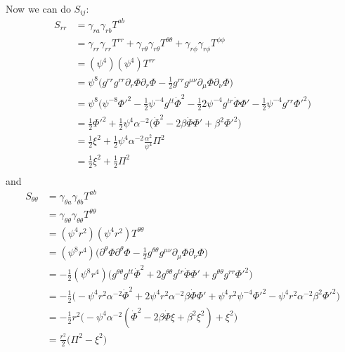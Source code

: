 \documentclass[12pt]{article}
\numberwithin{equation}{section}
\begin{document}
Now we can do $S_{ij}$:
\begin{equation} \label{eq:S_rr}
\begin{aligned}
S_{rr} &= \gamma_{ra} \gamma_{rb} T^{ab} \\
&= \gamma_{rr} \gamma_{rr} T^{rr} + \gamma_{r \theta} \gamma_{r\theta} T^{\theta \theta} + \gamma_{r\phi} \gamma_{r\phi} T^{\phi \phi} \\
&= (\psi^4) (\psi^4) T^{rr} \\
&= \psi^8 \Big( g^{rr} g^{rr} \partial_r \Phi \partial_r \Phi - \frac{1}{2} g^{r r} g^{\mu \nu} \partial_\mu \Phi \partial_\nu \Phi \Big) \\
&= \psi^8 \Big( \psi^{-8} \Phi'^2 - \frac{1}{2} \psi^{-4} g^{t t} \dot{\Phi}^2 - \frac{1}{2} 2 \psi^{-4} g^{t r} \dot{\Phi} \Phi' - \frac{1}{2} \psi^{-4} g^{r r} \Phi'^2 \Big) \\
&= \frac{1}{2} \Phi'^2 + \frac{1}{2} \psi^4 \alpha^{-2} \Big( \dot{\Phi}^2 - 2 \beta \dot{\Phi} \Phi' + \beta^2 \Phi'^2 \Big) \\
&= \frac{1}{2} \xi^2 + \frac{1}{2} \psi^4 \alpha^{-2} \frac{\alpha^2}{\psi^4} \Pi^2 \\
&= \frac{1}{2} \xi^2 + \frac{1}{2} \Pi^2 \\
\end{aligned}
\end{equation}
and
\begin{equation} \label{eq:S_thetatheta}
\begin{aligned}
S_{\theta \theta} &= \gamma_{\theta a} \gamma_{\theta b} T^{ab} \\
&= \gamma_{\theta \theta} \gamma_{\theta \theta} T^{\theta \theta} \\
&= (\psi^4 r^2) (\psi^4 r^2) T^{\theta \theta} \\
&= (\psi^8 r^4) \Big( \partial^\theta \Phi \partial^\theta \Phi - \frac{1}{2} g^{\theta \theta} g^{\mu \nu} \partial_\mu \Phi \partial_\nu \Phi  \Big) \\
&= - \frac{1}{2} (\psi^8 r^4) \Big( g^{\theta \theta} g^{t t} \dot{\Phi}^2 + 2 g^{\theta \theta} g^{t r} \dot{\Phi} \Phi' + g^{\theta \theta} g^{r r} \Phi'^2  \Big) \\
&= - \frac{1}{2} \Big( - \psi^4 r^2 \alpha^{-2} \dot{\Phi}^2 + 2 \psi^4 r^2 \alpha^{-2} \beta \dot{\Phi} \Phi' + \psi^4 r^2 \psi^{-4} \Phi'^2 - \psi^4 r^2 \alpha^{-2} \beta^2 \Phi'^2 \Big) \\
&= - \frac{1}{2} r^2 \Big( - \psi^4 \alpha^{-2} (\dot{\Phi}^2 - 2 \beta \dot{\Phi} \xi + \beta^2 \xi^2) + \xi^2 \Big) \\
&= \frac{r^2}{2} \Big( \Pi^2 - \xi^2 \Big) \\
\end{aligned}
\end{equation}
\end{document}
